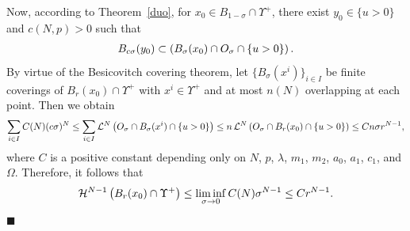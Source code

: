 \documentclass[onecolumn]{autart}
\newenvironment{proof}{{\it Proof: \enspace}}{\hfill $\blacksquare$\par}
\begin{document}
\begin{proof}
		Now, according to Theorem~\ref{duo}, for $x_0 \in B_{1-\sigma} \cap \Upsilon^+$, there exist $y_0 \in \{ u > 0 \}$ and $c(N, p) > 0$ such that
		\begin{align}
			B_{c\sigma}(y_0) \subset \left( B_\sigma(x_0) \cap O_\sigma \cap \{ u > 0 \}\right) .\notag
		\end{align}
		By virtue of the Besicovitch covering theorem, let $\{ B_\sigma(x^i) \}_{i \in I}$ be finite coverings of $B_r(x_0) \cap \Upsilon^+$ with $x^i \in \Upsilon^+$ and at most $n(N)$ overlapping at each point. Then we obtain
		\begin{align}
			\sum_{i \in I} C(N) (c\sigma)^N
			\leq \sum_{i \in I} \mathcal{L}^N\left( O_\sigma \cap B_\sigma(x^i) \cap \{ u > 0 \}\right)
			\leq n \, \mathcal{L}^N\left( O_\sigma \cap B_r(x_0) \cap \{ u > 0 \}\right)
			\leq C n \sigma r^{N-1},\notag
		\end{align}
		where $C$ is a positive  constant  depending only on $N$, $p$, $\lambda$, $m_1$, $m_2$, $a_0$,   $a_1$,  $c_1$,  and $\Omega$.
		Therefore, it follows that
		\begin{align}
			\mathcal{H}^{N-1}\left( B_r(x_0) \cap \Upsilon^+\right)
			\leq \liminf_{\sigma \to 0} C(N) \sigma^{N-1}
			\leq C r^{N-1}.\notag
		\end{align}
			\end{proof}
\end{document}
